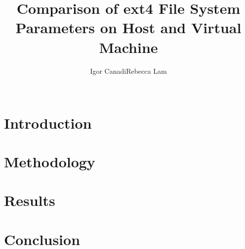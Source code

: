 \documentclass{sig-alternate-10pt}
\begin{document}
\title{Comparison of ext4 File System Parameters on Host and Virtual Machine}

\author{
	\alignauthor Igor Canadi\qquad Rebecca Lam\\
	\\
}

\maketitle

\lstset{
	breaklines=true
}




\section{Introduction}
\label{sec:intro}


\section{Methodology}
\label{sec:method}


\section{Results}
\label{sec:results}


\section{Conclusion}
\label{sec:conc}

\end{document}
